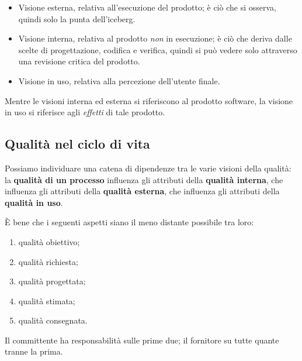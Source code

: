 \documentclass[a4paper]{article}
\begin{document}
	\begin{itemize}
		
			
	\item Visione esterna, relativa all'esecuzione del prodotto; è ciò che si osserva, quindi solo la punta dell'iceberg.
			
	\item Visione interna, relativa al prodotto \emph{non} in esecuzione; è ciò che deriva dalle scelte di progettazione, codifica e verifica, quindi si può vedere solo attraverso una revisione critica del prodotto.
			
	\item Visione in uso, relativa alla percezione dell'utente finale.
		
	\end{itemize}

		
Mentre le visioni interna ed esterna si riferiscono al prodotto software, la visione in uso si riferisce agli \emph{effetti} di tale prodotto.

		
	\subsection{Qualità nel ciclo di vita}

		
Possiamo individuare una catena di dipendenze tra le varie visioni della qualità: la \textbf{qualità di un processo} influenza gli attributi della \textbf{qualità interna}, che influenza gli attributi della \textbf{qualità esterna}, che influenza gli attributi della \textbf{qualità in uso}.
		
È bene che i seguenti aspetti siano il meno distante possibile tra loro:
		
	\begin{enumerate}
		
			
	\item qualità obiettivo;
			
	\item qualità richiesta;
			
	\item qualità progettata;
			
	\item qualità stimata;
			
	\item qualità consegnata.
		
	\end{enumerate}

		
Il committente ha responsabilità sulle prime due; il fornitore su tutte quante tranne la prima.
\end{document}
